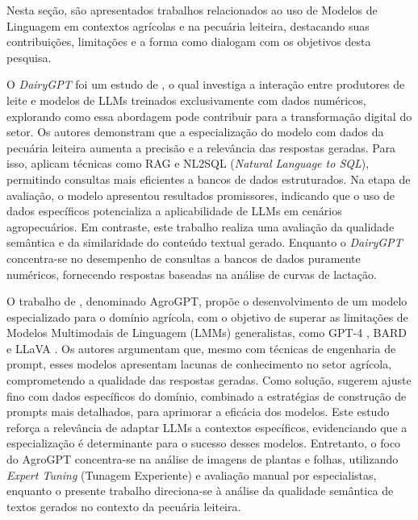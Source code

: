 
Nesta seção, são apresentados trabalhos relacionados ao uso de Modelos de Linguagem em contextos agrícolas e na pecuária leiteira, destacando suas contribuições, limitações e a forma como dialogam com os objetivos desta pesquisa.

 O \textit{DairyGPT} foi um estudo de \cite{GONTIJO2025101097}, o qual investiga a interação entre produtores de leite e modelos de LLMs treinados exclusivamente com dados numéricos, explorando como essa abordagem pode contribuir para a transformação digital do setor. Os autores demonstram que a especialização do modelo com dados da pecuária leiteira aumenta a precisão e a relevância das respostas geradas. Para isso, aplicam técnicas como RAG e NL2SQL (\textit{Natural Language to SQL}), permitindo consultas mais eficientes a bancos de dados estruturados. Na etapa de avaliação, o modelo apresentou resultados promissores, indicando que o uso de dados específicos potencializa a aplicabilidade de LLMs em cenários agropecuários. Em contraste, este trabalho realiza uma avaliação da qualidade semântica e da similaridade do conteúdo textual gerado. Enquanto o \textit{DairyGPT} concentra-se no desempenho de consultas a bancos de dados puramente numéricos, fornecendo respostas baseadas na análise de curvas de lactação.

O trabalho de \cite{awais2025agrogptefficientagriculturalvisionlanguage}, denominado AgroGPT, propõe o desenvolvimento de um modelo especializado para o domínio agrícola, com o objetivo de superar as limitações de Modelos Multimodais de Linguagem (LMMs) generalistas, como GPT-4 \cite{openai2023chatgpt}, BARD \cite{Bard} e LLaVA \cite{LLaVA}. Os autores argumentam que, mesmo com técnicas de engenharia de prompt, esses modelos apresentam lacunas de conhecimento no setor agrícola, comprometendo a qualidade das respostas geradas. Como solução, sugerem ajuste fino com dados específicos do domínio, combinado a estratégias de construção de prompts mais detalhados, para aprimorar a eficácia dos modelos. Este estudo reforça a relevância de adaptar LLMs a contextos específicos, evidenciando que a especialização é determinante para o sucesso desses modelos. Entretanto, o foco do AgroGPT concentra-se na análise de imagens de plantas e folhas, utilizando \textit{Expert Tuning} (Tunagem Experiente) e avaliação manual por especialistas, enquanto o presente trabalho direciona-se à análise da qualidade semântica de textos gerados no contexto da pecuária leiteira.

